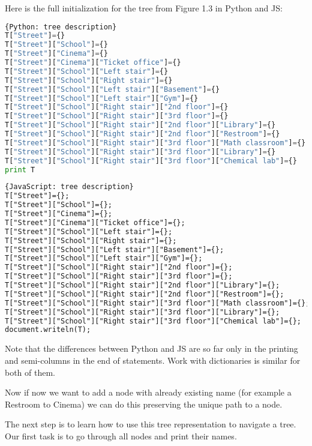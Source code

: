 Here is the full initialization for the tree from Figure 1.3 in Python and JS:

\begin{lstlisting}[style=codelst,basicstyle=\footnotesize,language=Python]{Python: tree description}
T["Street"]={}
T["Street"]["School"]={}
T["Street"]["Cinema"]={}
T["Street"]["Cinema"]["Ticket office"]={}
T["Street"]["School"]["Left stair"]={}
T["Street"]["School"]["Right stair"]={}
T["Street"]["School"]["Left stair"]["Basement"]={}
T["Street"]["School"]["Left stair"]["Gym"]={}
T["Street"]["School"]["Right stair"]["2nd floor"]={}
T["Street"]["School"]["Right stair"]["3rd floor"]={}
T["Street"]["School"]["Right stair"]["2nd floor"]["Library"]={}
T["Street"]["School"]["Right stair"]["2nd floor"]["Restroom"]={}
T["Street"]["School"]["Right stair"]["3rd floor"]["Math classroom"]={}
T["Street"]["School"]["Right stair"]["3rd floor"]["Library"]={}
T["Street"]["School"]["Right stair"]["3rd floor"]["Chemical lab"]={}
print T
\end{lstlisting}

\begin{lstlisting}[style=codelst,basicstyle=\footnotesize,language=HTML]{JavaScript: tree description}
T["Street"]={};
T["Street"]["School"]={};
T["Street"]["Cinema"]={};
T["Street"]["Cinema"]["Ticket office"]={};
T["Street"]["School"]["Left stair"]={};
T["Street"]["School"]["Right stair"]={};
T["Street"]["School"]["Left stair"]["Basement"]={};
T["Street"]["School"]["Left stair"]["Gym"]={};
T["Street"]["School"]["Right stair"]["2nd floor"]={};
T["Street"]["School"]["Right stair"]["3rd floor"]={};
T["Street"]["School"]["Right stair"]["2nd floor"]["Library"]={};
T["Street"]["School"]["Right stair"]["2nd floor"]["Restroom"]={};
T["Street"]["School"]["Right stair"]["3rd floor"]["Math classroom"]={};
T["Street"]["School"]["Right stair"]["3rd floor"]["Library"]={};
T["Street"]["School"]["Right stair"]["3rd floor"]["Chemical lab"]={};
document.writeln(T);
\end{lstlisting}

Note that the differences between Python and JS are so far only in the
printing and semi-columns in the end of statements.
Work with dictionaries is similar for both of them.

Now if now we want to add a node with already existing name (for example
a Restroom to Cinema) we can do this preserving the unique path to a node.

The next step is to learn how to use this tree representation to navigate
a tree. Our first task is to go through all nodes and print their names.

